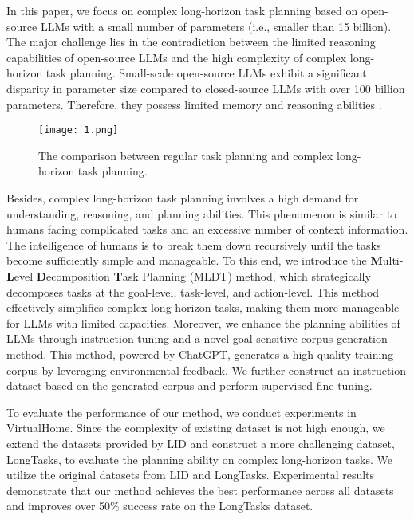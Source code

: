 In this paper, we focus on complex long-horizon task planning based on open-source LLMs with a small number of parameters (i.e., smaller than 15 billion). The major challenge lies in the contradiction between the limited reasoning capabilities of open-source LLMs and the high complexity of complex long-horizon task planning. Small-scale open-source LLMs exhibit a significant disparity in parameter size compared to closed-source LLMs with over 100 billion parameters. Therefore, they possess limited memory and reasoning abilities \cite{DBLP:journals/corr/abs-2001-08361,DBLP:conf/iclr/WeiBZGYLDDL22}. 

\begin{figure}[h]
    \centering
    \texttt{[image: 1.png]}
    \caption{The comparison between regular task planning and complex long-horizon task planning.}
    \label{Figure 1}
\end{figure}

Besides, complex long-horizon task planning involves a high demand for understanding, reasoning, and planning abilities. This phenomenon is similar to humans facing complicated tasks and an excessive number of context information. The intelligence of humans is to break them down recursively until the tasks become sufficiently simple and manageable. To this end, we introduce the \textbf{M}ulti-\textbf{L}evel \textbf{D}ecomposition \textbf{T}ask Planning (MLDT) method, which strategically decomposes tasks at the goal-level, task-level, and action-level. This method effectively simplifies complex long-horizon tasks, making them more manageable for LLMs with limited capacities. Moreover, we enhance the planning abilities of LLMs through instruction tuning and a novel goal-sensitive corpus generation method. This method, powered by ChatGPT, generates a high-quality training corpus by leveraging environmental feedback. We further construct an instruction dataset based on the generated corpus and perform supervised fine-tuning.

To evaluate the performance of our method, we conduct experiments in VirtualHome. Since the complexity of existing dataset is not high enough, we extend the datasets provided by LID \cite{DBLP:conf/nips/LiPPDWF0HAAAM0Z22} and construct a more challenging dataset, LongTasks, to evaluate the planning ability on complex long-horizon tasks. We utilize the original datasets from LID \cite{DBLP:conf/nips/LiPPDWF0HAAAM0Z22} and LongTasks. Experimental results demonstrate that our method achieves the best performance across all datasets and improves over 50\% success rate on the LongTasks dataset.

